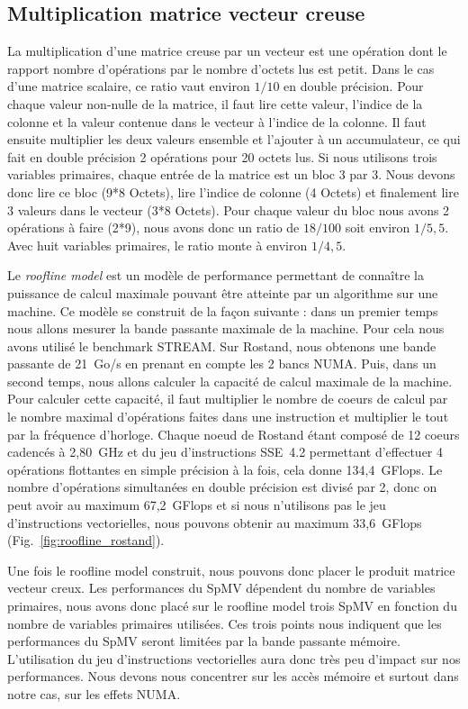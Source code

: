 \subsection{Multiplication matrice vecteur creuse}
La multiplication d'une matrice creuse par un vecteur est une opération dont le rapport nombre d'opérations par le nombre d'octets lus est petit.
%
Dans le cas d'une matrice scalaire, ce ratio vaut environ $1/10$ en double précision.
%
Pour chaque valeur non-nulle de la matrice, il faut lire cette valeur, l'indice de la colonne et la valeur contenue dans le vecteur à l'indice de la colonne.
%
Il faut ensuite multiplier les deux valeurs ensemble et l'ajouter à un accumulateur, ce qui fait en double précision 2 opérations pour 20 octets lus.
%
Si nous utilisons trois variables primaires, chaque entrée de la matrice est un bloc 3 par 3.
%
Nous devons donc lire ce bloc (9*8 Octets), lire l'indice de colonne (4 Octets) et finalement lire 3 valeurs dans le vecteur (3*8 Octets).
%
Pour chaque valeur du bloc nous avons 2 opérations à faire (2*9), nous avons donc un ratio de $18/100$ soit environ $1/5,5$.
%
Avec huit variables primaires, le ratio monte à environ $1/4,5$.

Le {\em roofline model} est un modèle de performance permettant de connaître la puissance de calcul maximale pouvant être atteinte par un algorithme sur une machine.
%
Ce modèle se construit de la façon suivante : dans un premier temps nous allons mesurer la bande passante maximale de la machine.
%
Pour cela nous avons utilisé le benchmark STREAM.
%
Sur Rostand, nous obtenons une bande passante de 21~Go/s en prenant en compte les 2 bancs NUMA.
%
Puis, dans un second temps, nous allons calculer la capacité de calcul maximale de la machine.
%
Pour calculer cette capacité, il faut multiplier le nombre de coeurs de calcul par le nombre maximal d'opérations faites dans une instruction et multiplier le tout par la fréquence d'horloge.
%
Chaque noeud de Rostand étant composé de 12 coeurs cadencés à 2,80~GHz et du jeu d'instructions SSE~4.2 permettant d'effectuer 4 opérations flottantes en simple précision à la fois, cela donne 134,4~GFlops.
%
Le nombre d'opérations simultanées en double précision est divisé par 2, donc on peut avoir au maximum 67,2~GFlops et si nous n'utilisons pas le jeu d'instructions vectorielles, nous pouvons obtenir au maximum 33,6~GFlops (Fig.~\ref{fig:roofline_rostand}).

Une fois le roofline model construit, nous pouvons donc placer le produit matrice vecteur creux.
%
Les performances du SpMV dépendent du nombre de variables primaires, nous avons donc placé sur le roofline model trois SpMV en fonction du nombre de variables primaires utilisées.
%
Ces trois points nous indiquent que les performances du SpMV seront limitées par la bande passante mémoire.
%
L'utilisation du jeu d'instructions vectorielles aura donc très peu d'impact sur nos performances.
%
Nous devons nous concentrer sur les accès mémoire et surtout dans notre cas, sur les effets NUMA.


